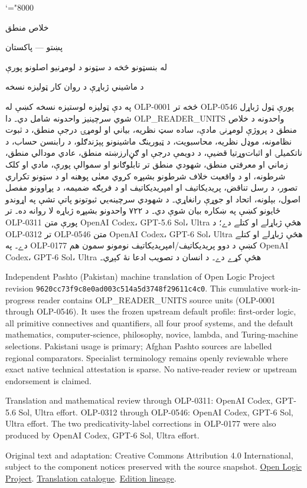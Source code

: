 \documentclass[11pt,a4paper,oneside]{report}
\theoremstyle{definition}
\begin{document}
\setRTL
\mathcode`\!="8000
\begin{titlepage}
\thispagestyle{empty}
\begin{center}
\vspace*{22mm}
{\Huge خلاص منطق}\par\bigskip
{\Large پښتو — پاکستان}\par\bigskip
{\LARGE له بنسټونو څخه د سټونو د لومړنيو اصلونو پورې}\par\bigskip
د ماشيني ژباړې د روان کار ټوليزه نسخه
\end{center}
\bigskip
په دې ټوليزه لوستيزه نسخه کښې له OLP-0001 څخه تر OLP-0546 پورې
ټول ژباړل شوي سرچينيز واحدونه شامل دي۔ دا OLP_READER_UNITS واحدونه د
خلاص منطق د پروژې لومړنۍ مادې، ساده سټ نظريه، بياني او لومړۍ درجې
منطق، د ثبوت نظامونه، موډل نظريه، محاسبويت، د ټيورينګ ماشينونو
پېژندګلو، د رابنسن حساب، د ناتکميلۍ او اثبات‌وړتيا قضيې، د دويمې درجې او
ګڼ‌ارزښته منطق، عادي مودالي منطق، زماني او معرفتي منطق، شهودي منطق
تر تابلوګانو او سموالې پورې، مادي او کلک شرطونه، او د واقعيت خلاف
شرطونو بشپړه کروي معنٰی پوهنه او د سټونو تکراري تصور،
د رسل تناقض، پريديکاتيف او امپريديکاتيف او د فرېګه ضميمه، د پړاوونو مفصل اصول، بېلونه، اتحاد او جوړې رانغاړي۔ د شهودي سرچينه‌يي ثبوتونو پاتې
تشې په اړوندو ځايونو کښې په ښکاره بيان شوې دي۔
د ۷۲۲ واحدونو بشپړه ژباړه لا روانه ده۔ تر OLP-0311 پورې متن
OpenAI Codex، GPT-5.6 Sol، Ultra هڅې ژباړلے او کتلے دے؛
د OLP-0312 تر OLP-0546 متن OpenAI Codex، GPT-6 Sol، Ultra
هڅې ژباړلے او کتلے دے۔ په OLP-0177 کښې د دوو پريديکاتيف/امپريديکاتيف
نومونو سمون هم OpenAI Codex، GPT-6 Sol، Ultra هڅې کړے دے۔
د انسان د تصويب ادعا نۀ کېږي۔

\begin{LTR}\latinfont\small
Independent Pashto (Pakistan) machine translation of Open Logic Project
revision \texttt{9620cc73f9c8e0ad003c514a5d3748f29611c4c0}. This cumulative
work-in-progress reader contains OLP_READER_UNITS source units (OLP-0001
through OLP-0546). It uses the frozen upstream default profile: first-order
logic, all primitive connectives and quantifiers, all four proof systems,
and the default mathematics, computer-science, philosophy, novice, lambda,
and Turing-machine selections. Pakistani usage is primary; Afghan Pashto
sources are labelled regional comparators. Specialist terminology remains
openly reviewable where exact native technical attestation is sparse. No
native-reader review or upstream endorsement is claimed.

Translation and mathematical review through OLP-0311: OpenAI Codex,
GPT-5.6 Sol, Ultra effort. OLP-0312 through OLP-0546: OpenAI Codex,
GPT-6 Sol, Ultra effort. The two predicativity-label corrections in
OLP-0177 were also produced by OpenAI Codex, GPT-6 Sol, Ultra effort.

Original text and adaptation: Creative Commons Attribution 4.0 International,
subject to the component notices preserved with the source snapshot.
\href{https://openlogicproject.org/}{Open Logic Project}.\quad
\href{https://github.com/KokunoYumeto/OpenLogic-translations}{Translation catalogue}.\quad
\href{https://doi.org/10.5281/zenodo.22307197}{Edition lineage}.
\end{LTR}
\end{titlepage}
\tableofcontents
\clearpage
\end{document}
